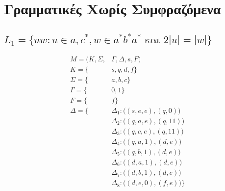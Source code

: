\section{Γραμματικές Χωρίς Συμφραζόμενα}

\subsection{$L_1 = \{uw : u \in{a, c}^*, w \in a^*b^*a^* \text{ και } 2|u| = |w| \}$}

\begin{align*}
M = (Κ, Σ,& Γ, Δ, s, F)\\
			K = \{&s, q, d, f\}\\
			Σ = \{&a, b, c\}\\
			Γ = \{&0, 1\}\\
			F  = \{&f\}\\
			Δ = \{& Δ_1 : \big(  (s, e, e), (q, 0) \big)\\
				  	 & Δ_2 : \big(  (q, a, e), (q, 11) \big)\\
				 	 & Δ_3 : \big(  (q, c, e), (q, 11) \big)\\
				 	 & Δ_4 : \big(  (q, a, 1), (d, e) \big)\\
				 	 & Δ_5 : \big(  (q, b, 1), (d, e) \big)\\
				 	 & Δ_6 : \big(  (d, a, 1), (d, e) \big)\\
				 	 & Δ_7 : \big(  (d, b, 1), (d, e) \big)\\
					 & Δ_8 : \big(  (d, e, 0), (f, e) \big)\}
\end{align*}

